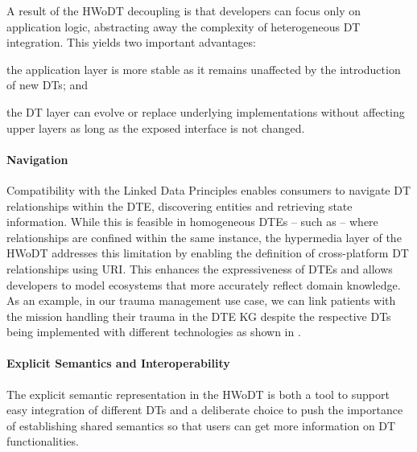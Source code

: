 A result of the \ac{HWoDT} decoupling is that developers can focus only on application logic, abstracting away the complexity of heterogeneous \ac{DT} integration.  
This yields two important advantages:  
\begin{inlinelist}
    \item the application layer is more stable as it remains unaffected by the introduction of new \acp{DT};
    and  
    \item the \ac{DT} layer can evolve or replace underlying implementations without affecting upper layers as long as the exposed interface is not changed.
\end{inlinelist}

\paragraph{Navigation}
Compatibility with the Linked Data Principles enables consumers to navigate \ac{DT} relationships within the \ac{DTE}, discovering entities and retrieving state information.
%
While this is feasible in homogeneous \acp{DTE} -- such as \azureTwin{} -- where relationships are confined within the same instance, the hypermedia layer of the \ac{HWoDT} addresses this limitation by enabling the definition of cross-platform \ac{DT} relationships using \ac{URI}.   
This enhances the expressiveness of \acp{DTE} and allows developers to model ecosystems that more accurately reflect domain knowledge.
%
As an example, in our trauma management use case, we can link patients with the mission handling their trauma in the \ac{DTE} \ac{KG} despite the respective \acp{DT} being implemented with different technologies as shown in .


%     

\paragraph{Explicit Semantics and Interoperability}

The explicit semantic representation in the \ac{HWoDT} is both a tool to support easy integration of different \acp{DT} and a deliberate choice to push the importance of establishing shared semantics so that users can get more information on \ac{DT} functionalities.

